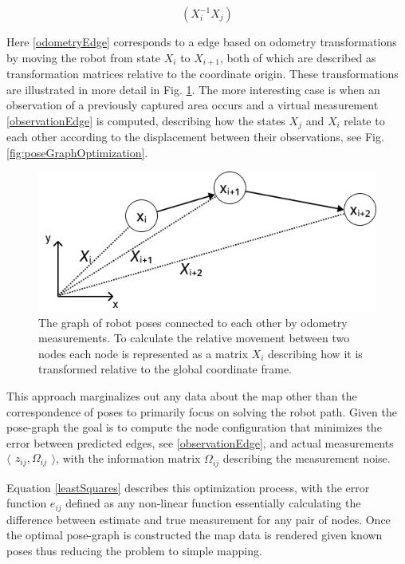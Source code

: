 \begin{equation}\label{observationEdge}
	(X_{i}^{-1}X_{j})
\end{equation}

Here \ref{odometryEdge} corresponds to a edge based on odometry transformations by moving the robot from state $X_{i}$ to $X_{i+1}$, both of which are described as transformation matrices relative to the coordinate origin.
These transformations are illustrated in more detail in Fig. \ref{fig:poseGraphTransformation}.
The more interesting case is when an observation of a previously captured area occurs and a virtual measurement \ref{observationEdge} is computed, describing how the states $X_{j}$ and $X_{i}$ relate to each other according to the displacement between their observations, see Fig. \ref{fig:poseGraphOptimization}.

\begin{figure}
	\centering
	\includegraphics[width=0.6\linewidth]{img/PoseGraphTransformation}
	\caption{
		The graph of robot poses connected to each other by odometry measurements. To calculate the relative movement between two nodes each node is represented as a matrix $X_{i}$ describing how it is transformed relative to the global coordinate frame. 
	}
	\label{fig:poseGraphTransformation}
\end{figure}



This approach marginalizes out any data about the map other than the correspondence of poses to primarily focus on solving the robot path.  
Given the pose-graph the goal is to compute the node configuration that minimizes the error between predicted edges, see \ref{observationEdge}, and actual measurements 
$
\langle
\begin{matrix}
	z_{ij},  \Omega_{ij}
\end{matrix}
\rangle
$, with the information matrix $\Omega_{ij}$ describing the measurement noise.

Equation \ref{leastSquares} describes this optimization process, with the error function $e_{ij}$ defined as any non-linear function essentially calculating the difference between estimate and true measurement for any pair of nodes. 
Once the optimal pose-graph is constructed the map data is rendered given known poses thus reducing the problem to simple mapping.

